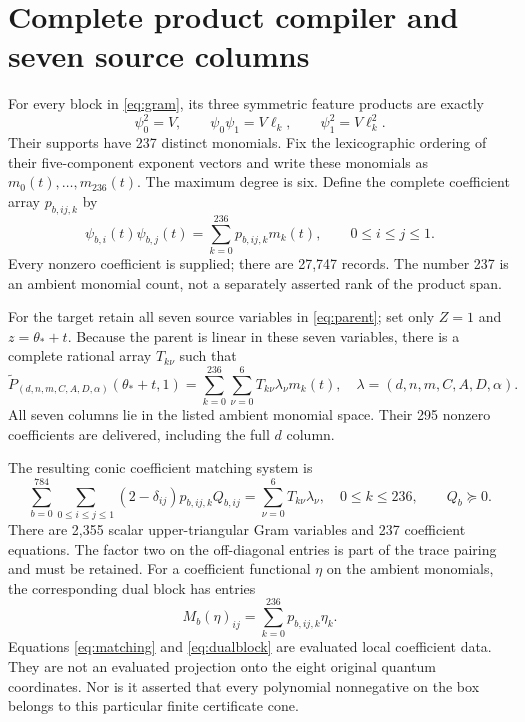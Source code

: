 \documentclass[11pt]{article}
\theoremstyle{definition}
\begin{document}
\section{Complete product compiler and seven source columns}
\label{sec:compiler}

For every block in \eqref{eq:gram}, its three symmetric feature products are
exactly
\begin{equation}
 \psi_0^2=V,\qquad \psi_0\psi_1=V\ell_k,\qquad
 \psi_1^2=V\ell_k^2.
 \label{eq:products}
\end{equation}
Their supports have 237 distinct monomials. Fix the lexicographic ordering
of their five-component exponent vectors and write these monomials as
$m_0(t),\ldots,m_{236}(t)$. The maximum degree is six. Define the complete
coefficient array $p_{b,ij,k}$ by
\begin{equation}
 \psi_{b,i}(t)\psi_{b,j}(t)=\sum_{k=0}^{236}p_{b,ij,k}m_k(t),
 \qquad 0\leq i\leq j\leq1.
 \label{eq:productmap}
\end{equation}
Every nonzero coefficient is supplied; there are 27,747 records. The number
237 is an ambient monomial count, not a separately asserted rank of the
product span.

For the target retain all seven source variables in \eqref{eq:parent}; set
only $Z=1$ and $z=\theta_*+t$. Because the parent is linear in these seven
variables, there is a complete rational array $T_{k\nu}$ such that
\begin{equation}
 \widetilde P_{(d,n,m,C,A,D,\alpha)}(\theta_*+t,1)
 =\sum_{k=0}^{236}\sum_{\nu=0}^6 T_{k\nu}\lambda_\nu m_k(t),
 \quad\lambda=(d,n,m,C,A,D,\alpha).
 \label{eq:target}
\end{equation}
All seven columns lie in the listed ambient monomial space. Their 295
nonzero coefficients are delivered, including the full $d$ column.

The resulting conic coefficient matching system is
\begin{equation}
 \sum_{b=0}^{784}\sum_{0\leq i\leq j\leq1}
       (2-\delta_{ij})p_{b,ij,k}Q_{b,ij}
  =\sum_{\nu=0}^6T_{k\nu}\lambda_\nu,\quad 0\leq k\leq236,
 \qquad Q_b\succeq0.
 \label{eq:matching}
\end{equation}
There are 2,355 scalar upper-triangular Gram variables and 237 coefficient
equations. The factor two on the off-diagonal entries is part of the trace
pairing and must be retained. For a coefficient functional $\eta$ on the
ambient monomials, the corresponding dual block has entries
\begin{equation}
 M_b(\eta)_{ij}=\sum_{k=0}^{236}p_{b,ij,k}\eta_k.
 \label{eq:dualblock}
\end{equation}
Equations \eqref{eq:matching} and \eqref{eq:dualblock} are evaluated local
coefficient data. They are not an evaluated projection onto the eight original
quantum coordinates. Nor is it asserted that every polynomial nonnegative
on the box belongs to this particular finite certificate cone.
\end{document}
